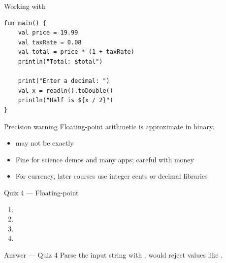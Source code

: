 \documentclass[aspectratio=169,11pt]{beamer}
\begin{document}
    \begin{frame}[fragile]{Working with }
        \begin{lstlisting}
fun main() {
    val price = 19.99
    val taxRate = 0.08
    val total = price * (1 + taxRate)
    println("Total: $total")

    print("Enter a decimal: ")
    val x = readln().toDouble()
    println("Half is ${x / 2}")
}
        \end{lstlisting}
    \end{frame}

    \begin{frame}{Precision warning}
        Floating-point arithmetic is approximate in binary.
        \vspace{0.5em}
        \begin{itemize}
            \item {} may not be exactly 
            \item Fine for science demos and many apps; careful with money
            \item For currency, later courses use integer cents or decimal libraries
        \end{itemize}
        \vspace{0.4em}
    \end{frame}

    \begin{frame}{Quiz 4 --- Floating-point}
        \begin{enumerate}
            \item {}
            \item {}
            \item {}
            \item {}
        \end{enumerate}
        \quizpause
    \end{frame}

    \begin{frame}{Answer --- Quiz 4}
        \vspace{0.4em}
        Parse the input string with .
         would reject values like .
    \end{frame}
\end{document}
